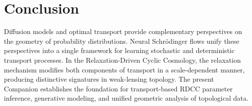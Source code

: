 \documentclass[11pt,a4paper]{article}
\begin{document}
\section{Conclusion}

Diffusion models and optimal transport provide complementary perspectives on the 
geometry of probability distributions. Neural Schrödinger flows unify these 
perspectives into a single framework for learning stochastic and deterministic 
transport processes. In the Relaxation-Driven Cyclic Cosmology, the relaxation 
mechanism modifies both components of transport in a scale-dependent manner, 
producing distinctive signatures in weak-lensing topology. The present Companion 
establishes the foundation for transport-based RDCC parameter inference, 
generative modeling, and unified geometric analysis of topological data.


\nocite{*}

\end{document}
